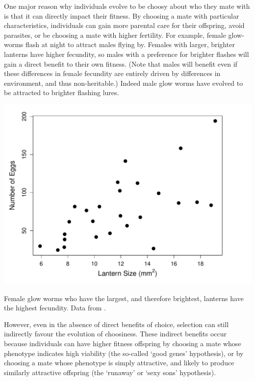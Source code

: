 One major reason why individuals evolve to be choosy about who they mate with is that it can directly impact their fitness. By choosing a mate with
particular characteristics, individuals can gain more parental care for
their offspring, avoid parasites, or be choosing a mate with higher fertility. For example,  female glow-worms flash at night to attract males flying by. Females with larger, brighter lanterns have higher fecundity, so
males with a preference for brighter flashes will gain a direct benefit to their own fitness. (Note that males will benefit even if these differences in female fecundity are entirely driven by differences in environment, and thus non-heritable.) Indeed male glow worms have evolved to be attracted to brighter
flashing lures.  
\begin{marginfigure}[-0.5cm]
\begin{center}
\includegraphics[width= \textwidth]{Journal_figs/Quant_gen/glow_worm_flashes/glow_worm_flashes.pdf}
\end{center}
\caption{Female glow worms who have the largest, and therefore
  brightest, lanterns have the highest fecundity. Data from
  \citet{hopkins2015m}.  } \label{fig:glow_worms_lantern}
\end{marginfigure}
However, even in the absence of direct benefits of choice, selection can still indirectly favour the evolution of choosiness. These
indirect benefits occur because individuals can have higher fitness
offspring by choosing a mate whose phenotype indicates high viability
(the so-called `good genes' hypothesis), or by choosing a mate whose
phenotype is simply attractive, and likely to produce similarly
attractive offspring (the `runaway' or `sexy sons' hypothesis).

